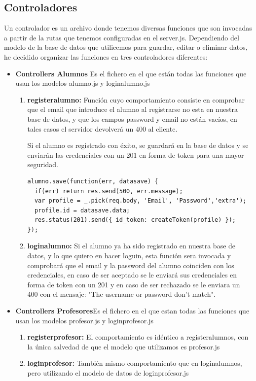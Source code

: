\subsection{Controladores} Un controlador es un archivo donde tenemos diversas funciones que son invocadas a partir de la rutas que tenemos configuradas en el server.js. Dependiendo del modelo de la base de datos que utilicemos para guardar, editar o eliminar datos, he decidido organizar las funciones en tres controladores diferentes:

\begin{itemize}
\item \textbf{Controllers Alumnos} Es el fichero en el que están todas las funciones que usan los modelos alumno.js y loginalumno.js
\begin{enumerate}
    \item \textbf {registeralumno: } Función cuyo comportamiento consiste en comprobar que el email que introduce el alumno al registrarse no esta en nuestra base de datos, y que los campos password y email no están vacíos, en tales casos el servidor devolverá un 400 al cliente. 
    
    Si el alumno es registrado con éxito, se guardará en la base de datos y se enviarán las credenciales con un 201 en forma de token para una mayor seguridad.
    
    \begin{lstlisting}
alumno.save(function(err, datasave) {
  if(err) return res.send(500, err.message);
  var profile = _.pick(req.body, 'Email', 'Password','extra');
  profile.id = datasave.data;
  res.status(201).send({ id_token: createToken(profile) });
});
    \end{lstlisting}
    
    \item \textbf {loginalumno: } Si el alumno ya ha sido registrado en nuestra base de datos, y lo que quiero en hacer loguin, esta función sera invocada y comprobará que el email y la password del alumno coinciden con los credenciales, en caso de ser aceptado se le enviará sus credenciales en forma de token con un 201 y en caso de ser rechazado se le enviara un 400 con el mensaje: "The username or password don't match".
    
\end{enumerate}
\item \textbf{Controllers Profesores}Es el fichero en el que estan todas las funciones que usan los modelos profesor.js y loginprofesor.js
\begin{enumerate}
    \item \textbf {registerprofesor: }El comportamiento es idéntico a registeralumnos, con la única salvedad de que el modelo que utilizamos es profesor.js
    \item \textbf {loginprofesor: } También mismo comportamiento que en loginalumnos, pero utilizando el modelo de datos de loginprofesor.js
    

\end{enumerate}
\end{itemize}
